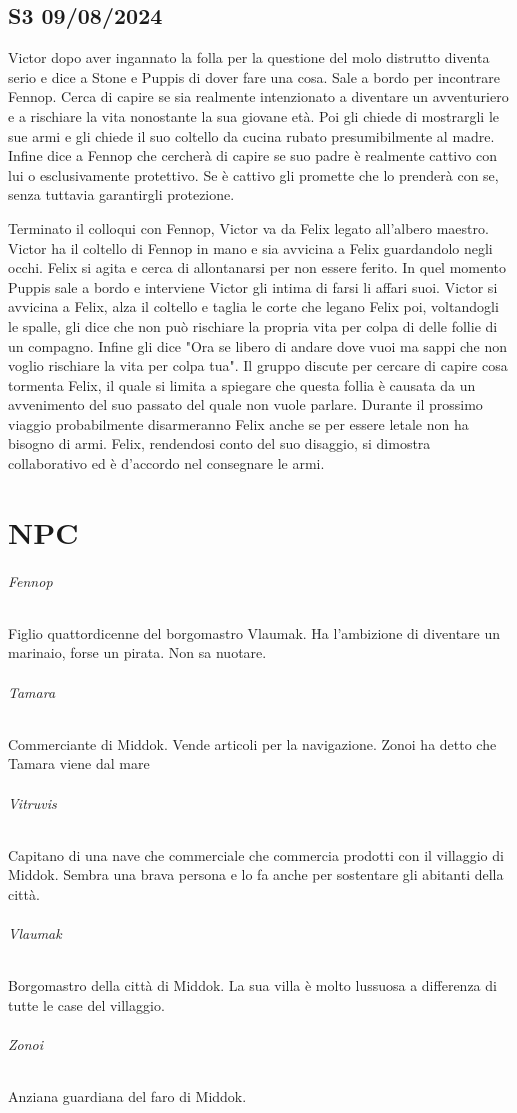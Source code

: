 \documentclass[letterpaper,twocolumn,openany, nodeprecatedcode, nomultitoc]{dndbook}
\begin{document}
\section{S3 09/08/2024}
Victor dopo aver ingannato la folla per la questione del molo distrutto diventa serio e dice a Stone e Puppis di dover fare una cosa. Sale a bordo per incontrare Fennop. Cerca di capire se sia realmente intenzionato a diventare un avventuriero e a rischiare la vita nonostante la sua giovane età. Poi gli chiede di mostrargli le sue armi e gli chiede il suo coltello da cucina rubato presumibilmente al madre. Infine dice a Fennop che cercherà di capire se suo padre è realmente cattivo con lui o esclusivamente protettivo. Se è cattivo gli promette che lo prenderà con se, senza tuttavia garantirgli protezione.

Terminato il colloqui con Fennop, Victor va da Felix legato all'albero maestro. Victor ha il coltello di Fennop in mano e sia avvicina a Felix guardandolo negli occhi. Felix si agita e cerca di allontanarsi per non essere ferito. In quel momento Puppis sale a bordo e interviene Victor gli intima di farsi li affari suoi. Victor si avvicina a Felix, alza il coltello e taglia le corte che legano Felix poi, voltandogli le spalle, gli dice che non può rischiare la propria vita per colpa di delle follie di un compagno. Infine gli dice "Ora se libero di andare dove vuoi ma sappi che non voglio rischiare la vita per colpa tua". Il gruppo discute per cercare di capire cosa tormenta Felix, il quale si limita a spiegare che questa follia è causata da un avvenimento del suo passato del quale non vuole parlare. Durante il prossimo viaggio probabilmente disarmeranno Felix anche se per essere letale non ha bisogno di armi. Felix, rendendosi conto del suo disaggio, si dimostra collaborativo ed è d'accordo nel consegnare le armi.


\chapter{NPC}

\subparagraph{Fennop} Figlio quattordicenne del borgomastro Vlaumak. Ha l'ambizione di diventare un marinaio, forse un pirata. Non sa nuotare.

\subparagraph{Tamara} Commerciante di Middok. Vende articoli per la navigazione. Zonoi ha detto che Tamara viene dal mare

\subparagraph{Vitruvis} Capitano di una nave che commerciale che commercia prodotti con il villaggio di Middok. Sembra una brava persona e lo fa anche per sostentare gli abitanti della città.

\subparagraph{Vlaumak} Borgomastro della città di Middok. La sua villa è molto lussuosa a differenza di tutte le case del villaggio.

\subparagraph{Zonoi} Anziana guardiana del faro di Middok.
\end{document}
